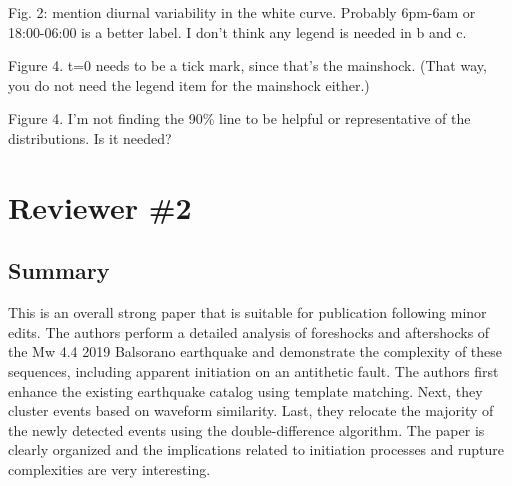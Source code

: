 \documentclass[10pt]{extarticle}
\begin{document}
\begin{ReviewerComment}{1}
\noindent 
Fig. 2: mention diurnal variability in the white curve. Probably 6pm-6am or 18:00-06:00 is a better label. I don't think any legend is needed in b and c.

\end{ReviewerComment}


\begin{Answer}
 \WorkInProgressRevTask
\end{Answer}
%
%


\begin{ReviewerComment}{1}
\noindent 
Figure 4. t=0 needs to be a tick mark, since that's the mainshock. (That way, you do not need the legend item for the mainshock either.)

\end{ReviewerComment}


\begin{Answer}
 \WorkInProgressRevTask
\end{Answer}
%
%


\begin{ReviewerComment}{1}
\noindent 
Figure 4. I'm not finding the 90\% line to be helpful or representative of the distributions. Is it needed?

\end{ReviewerComment}


\begin{Answer}
 \WorkInProgressRevTask
\end{Answer}
%
%

\section*{Reviewer \#2}


\subsection*{Summary}

This is an overall strong paper that is suitable for publication following minor edits. The authors perform a detailed analysis of foreshocks and aftershocks of the Mw 4.4 2019 Balsorano earthquake and demonstrate the complexity of these sequences, including apparent initiation on an antithetic fault. The authors first enhance the existing earthquake catalog using template matching. Next, they cluster events based on waveform similarity. Last, they relocate the majority of the newly detected events using the double-difference algorithm. The paper is clearly organized and the implications related to initiation processes and rupture complexities are very interesting.  \\
\end{document}
